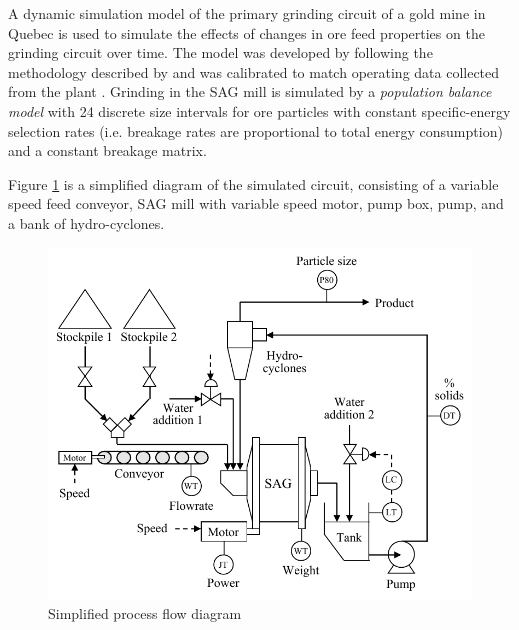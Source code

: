 
A dynamic simulation model of the primary grinding circuit of a gold mine in Quebec is used to simulate the effects of changes in ore feed properties on the grinding circuit over time. The model was developed by \cite{perez_garcia_dynamic_2020} following the methodology described by \cite{grimble_dynamic_2010} and was calibrated to match operating data collected from the plant \citep{perez-garcia_systematic_2020}. Grinding in the SAG mill is simulated by a \textit{population balance model} with 24 discrete size intervals for ore particles with constant specific-energy selection rates (i.e. breakage rates are proportional to total energy consumption) and a constant breakage matrix.

Figure \ref{fig:sag-diag} is a simplified diagram of the simulated circuit, consisting of a variable speed feed conveyor, SAG mill with variable speed motor, pump box, pump, and a bank of hydro-cyclones.
\begin{figure}[htp]
	\centering
	\includegraphics[width=12.5cm]{images/sag-circuit-diag.pdf}
	\caption{Simplified process flow diagram}
	\label{fig:sag-diag}
\end{figure}

